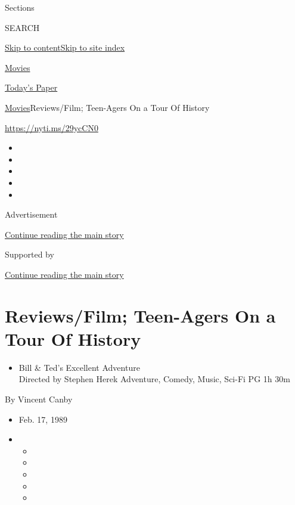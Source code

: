 Sections

SEARCH

\protect\hyperlink{site-content}{Skip to
content}\protect\hyperlink{site-index}{Skip to site index}

\href{https://www.nytimes3xbfgragh.onion/section/movies}{Movies}

\href{https://myaccount.nytimes3xbfgragh.onion/auth/login?response_type=cookie\&client_id=vi}{}

\href{https://www.nytimes3xbfgragh.onion/section/todayspaper}{Today's
Paper}

\href{/section/movies}{Movies}\textbar{}Reviews/Film; Teen-Agers On a
Tour Of History

\url{https://nyti.ms/29ycCN0}

\begin{itemize}
\item
\item
\item
\item
\item
\end{itemize}

Advertisement

\protect\hyperlink{after-top}{Continue reading the main story}

Supported by

\protect\hyperlink{after-sponsor}{Continue reading the main story}

\hypertarget{reviewsfilm-teen-agers-on-a-tour-of-history}{%
\section{Reviews/Film; Teen-Agers On a Tour Of
History}\label{reviewsfilm-teen-agers-on-a-tour-of-history}}

\begin{itemize}
\tightlist
\item
  Bill \& Ted's Excellent Adventure\\
  Directed by Stephen Herek Adventure, Comedy, Music, Sci-Fi PG 1h 30m
\end{itemize}

By Vincent Canby

\begin{itemize}
\item
  Feb. 17, 1989
\item
  \begin{itemize}
  \item
  \item
  \item
  \item
  \item
  \end{itemize}
\end{itemize}

